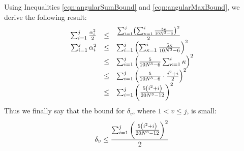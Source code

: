 Using Inequalities \ref{eqn:angularSumBound} and \ref{eqn:angularMaxBound}, we derive the following result:
$$
\begin{array}{rcl}
\sum_{i=1}^j \frac{\alpha_i^2}{2} &\leq& \frac{\sum_{i=1}^j \left( \sum_{\kappa=1}^i \frac{5\kappa}{10N^3-6} \right)^2}{2}\\
\sum_{i=1}^j \alpha_i^2 &\leq& \sum_{i=1}^j \left( \sum_{\kappa=1}^i \frac{5\kappa}{10N^3-6} \right)^2\\
&\leq&\sum_{i=1}^j  \left(  \frac{5}{10N^3-6} \sum_{\kappa=1}^i \kappa \right)^2\\
&\leq&\sum_{i=1}^j  \left(  \frac{5}{10N^3-6}\cdot \frac{i^2+i}{2} \right)^2\\
&\leq&\sum_{i=1}^j  \left(  \frac{5\left( i^2+i \right)}{20N^3-12} \right)^2\\
\end{array}$$
Thus we finally say that the bound for $\delta_v$, where $1<v\leq j$, is small:
\begin{equation}\label{eqn:verticalBound}
\delta_v \leq \frac{\sum_{i=1}^j  \left(  \frac{5\left( i^2+i \right)}{20N^3-12} \right)^2}{2}
\end{equation}



